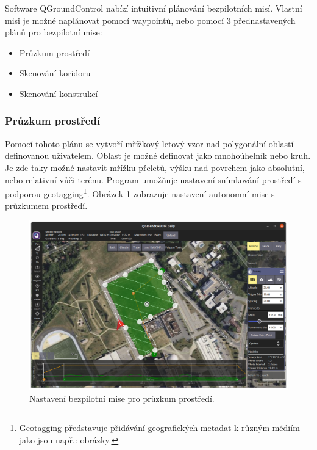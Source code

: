 Software QGroundControl nabízí intuitivní plánování bezpilotních misí. Vlastní misi je možné naplánovat pomocí waypointů, nebo pomocí 3 přednastavených plánů pro bezpilotní mise: \cite{QGround2}

\begin{itemize}
    \item Průzkum prostředí
    \item Skenování koridoru
    \item Skenování konstrukcí
\end{itemize}

\subsubsection{Průzkum prostředí}

Pomocí tohoto plánu se vytvoří mřížkový letový vzor nad polygonální oblastí definovanou uživatelem. Oblast je možné definovat jako mnohoúhelník nebo kruh. Je zde taky možné nastavit mřížku přeletů, výšku nad povrchem jako absolutní, nebo relativní vůči terénu. Program umožňuje nastavení snímkování prostředí s podporou geotagging\footnote{Geotagging představuje přidávání geografických metadat k různým médiím jako jsou např.: obrázky.}. Obrázek \ref{fig:QGC2} zobrazuje nastavení autonomní mise s průzkumem prostředí.

\begin{figure}[!ht]
    \begin{center}
        \includegraphics[scale=0.34]{obrazky/QGC3}
    \end{center}
    \caption[Nastavení bezpilotní mise pro průzkum prostředí]{Nastavení bezpilotní mise pro průzkum prostředí.}
    \label{fig:QGC2}
\end{figure}

